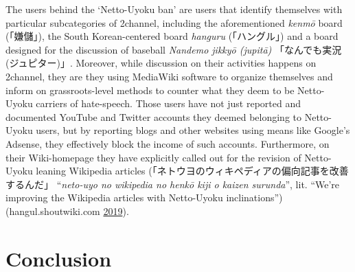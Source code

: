 \documentclass[10pt,british,A4paper,,openany]{memoir}
\begin{document}
The users behind the `Netto-Uyoku ban' are users that identify
themselves with particular subcategories of 2channel, including the
aforementioned \emph{kenmō} board (「嫌儲」), the South Korean-centered
board \emph{hanguru} (「ハングル」) and a board designed for the
discussion of baseball \emph{Nandemo jikkyō (jupitā)} 「なんでも実況
(ジュピター)」. Moreover, while discussion on their activities happens
on 2channel, they are they using MediaWiki software to organize
themselves and inform on grassroots-level methods to counter what they
deem to be Netto-Uyoku carriers of hate-speech. Those users have not
just reported and documented YouTube and Twitter accounts they deemed
belonging to Netto-Uyoku users, but by reporting blogs and other
websites using means like Google's Adsense, they effectively block the
income of such accounts. Furthermore, on their Wiki-homepage they have
explicitly called out for the revision of Netto-Uyoku leaning Wikipedia
articles (「ネトウヨのウィキペディアの偏向記事を改善するんだ」
``\emph{neto-uyo no wikipedia no henkō kiji o kaizen surunda}'', lit.
``We're improving the Wikipedia articles with Netto-Uyoku
inclinations'') (hangul.shoutwiki.com
\protect\hyperlink{ref-hangul.shoutwiki.com_wikipedia_2019}{2019}).

\section{Conclusion}\label{conclusion-2}
\end{document}
